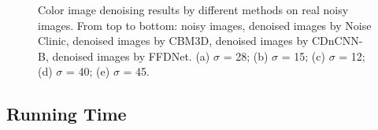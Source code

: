 \documentclass[journal]{IEEEtran}
\begin{document}
\begin{figure}[!htbp]
\begin{center}
\caption{Color image denoising results by different methods on real noisy images. From top to bottom: noisy images, denoised images by Noise Clinic, denoised images by CBM3D, denoised images by CDnCNN-B, denoised images by FFDNet. (a) $\sigma$ = 28; (b) $\sigma$ = 15; (c) $\sigma$ = 12; (d) $\sigma$ = 40; (e) $\sigma$ = 45.}\label{fig_rn2}
\end{center}%
\end{figure}


\subsection{Running Time}\label{section_runtime}
\end{document}
